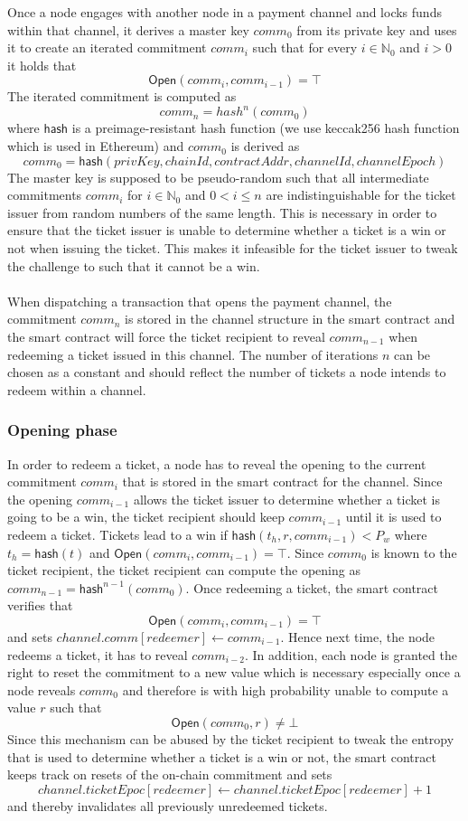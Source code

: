 Once a node engages with another node in a payment channel and locks funds within that channel, it derives a master key $comm_0$ from its private key and uses it to create an iterated commitment $comm_i$ such that for every $i \in \mathbb{N}_0$ and $i > 0$ it holds that $$ \mathsf{Open}(comm_{i}, comm_{i-1}) = \top $$
The iterated commitment is computed as $$comm_n = hash^n(comm_0)$$ where $\mathsf{hash}$ is a preimage-resistant hash function (we use keccak256 hash function which is used in Ethereum) and $comm_0$ is derived as 
$$ comm_0 = \mathsf{hash}(privKey, chainId, contractAddr, channelId, channelEpoch)$$
The master key is supposed to be pseudo-random such that all intermediate commitments $comm_{i}$ for $i \in \mathbb{N}_0$ and $0 < i \le n$ are indistinguishable for the ticket issuer from random numbers of the same length. This is necessary in order to ensure that the ticket issuer is unable to determine whether a ticket is a win or not when issuing the ticket. This makes it infeasible for the ticket issuer to tweak the challenge to such that it cannot be a win.
\\~\\When dispatching a transaction that opens the payment channel, the commitment $comm_n$ is stored in the channel structure in the smart contract and the smart contract will force the ticket recipient to reveal $comm_{n-1}$ when redeeming a ticket issued in this channel.
The number of iterations $n$ can be chosen as a constant and should reflect the number of tickets a node intends to redeem within a channel.

\subsubsection{Opening phase}

In order to redeem a ticket, a node has to reveal the opening to the current commitment $comm_i$ that is stored in the smart contract for the channel. Since the opening $comm_{i-1}$ allows the ticket issuer to determine whether a ticket is going to be a win, the ticket recipient should keep $comm_{i-1}$ until it is used to redeem a ticket.
Tickets lead to a win if $\mathsf{hash}( t_h, r, comm_{i-1} ) < P_w$ where $t_h=\mathsf{hash}(t)$ and $\mathsf{Open}(comm_i, comm_{i-1}) = \top$. Since $comm_{0}$ is known to the ticket recipient, the ticket recipient can compute the opening as $comm_{n-1} = \mathsf{hash}^{n-1}(comm_0)$.
Once redeeming a ticket, the smart contract verifies that $$\mathsf{Open}(comm_i, comm_{i-1}) = \top$$ and sets $channel.comm[redeemer] \leftarrow comm_{i-1}$. Hence next time, the node redeems a ticket, it has to reveal $comm_{i-2}$.
In addition, each node is granted the right to reset the commitment to a new value which is necessary especially once a node reveals $comm_0$ and therefore is with high probability unable to compute a value $r$ such that $$\mathsf{Open}(comm_0,r) \neq \bot$$
Since this mechanism can be abused by the ticket recipient to tweak the entropy that is used to determine whether a ticket is a win or not, the smart contract keeps track on resets of the on-chain commitment and sets $$channel.ticketEpoc[redeemer] \leftarrow channel.ticketEpoc[redeemer] + 1$$ and thereby invalidates all previously unredeemed tickets.


